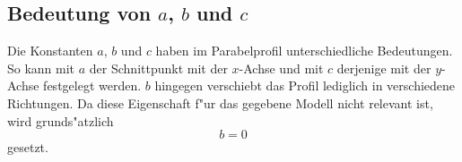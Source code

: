 \subsection{Bedeutung von \texorpdfstring{$a$}{a}, \texorpdfstring{$b$}{b} und 
\texorpdfstring{$c$}{c}}

Die Konstanten $a$, $b$ und $c$ haben im Parabelprofil unterschiedliche 
Bedeutungen. So kann mit $a$ der Schnittpunkt mit der $x$-Achse 
und mit $c$ derjenige mit der $y$-Achse festgelegt werden. $b$ hingegen 
verschiebt das Profil lediglich in verschiedene Richtungen. Da diese 
Eigenschaft f"ur das gegebene Modell nicht relevant ist, wird grunds"atzlich
\begin{equation*}
	b = 0
\end{equation*}
gesetzt.